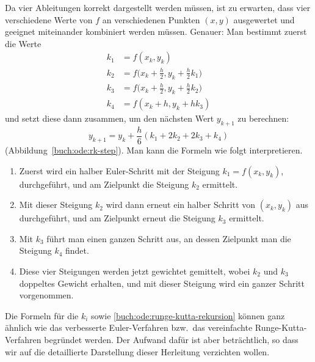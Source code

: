 Da vier Ableitungen korrekt dargestellt werden müssen, ist zu erwarten,
dass vier verschiedene Werte von $f$ an verschiedenen Punkten $(x,y)$
ausgewertet und geeignet miteinander kombiniert werden müssen.
Genauer: Man bestimmt zuerst die Werte
\begin{align*}
k_1&=f(x_k,y_k)\\
k_2&=f\biggl(x_k+\frac{h}2,y_k+\frac{h}2k_1\biggr)\\
k_3&=f\biggl(x_k+\frac{h}2,y_k+\frac{h}2k_2\biggr)\\
k_4&=f(x_k+h, y_k+hk_3)
\end{align*}
und setzt diese dann zusammen, um den nächsten Wert $y_{k+1}$
zu berechnen:
\begin{equation}
y_{k+1} = y_k + \frac{h}6(k_1 + 2k_2 + 2k_3 + k_4)
\label{buch:ode:runge-kutta-rekursion}
\end{equation}
(Abbildung~\ref{buch:ode:rk-step}).
Man kann die Formeln wie folgt interpretieren.
\begin{enumerate}
\item
Zuerst wird ein halber Euler-Schritt mit der Steigung $k_1=f(x_k,y_k)$,
durchgeführt, und am Zielpunkt die Steigung $k_2$ ermittelt.
\item
Mit dieser Steigung $k_2$ wird dann erneut ein halber Schritt von $(x_k,y_k)$
aus durchgeführt, und am Zielpunkt erneut die Steigung $k_3$ ermittelt.
\item
Mit $k_3$ führt man einen ganzen Schritt aus, an dessen Zielpunkt man die
Steigung $k_4$ findet.
\item
Diese vier Steigungen werden jetzt gewichtet gemittelt, wobei
$k_2$ und $k_3$ doppeltes Gewicht erhalten, und mit dieser
Steigung wird ein ganzer Schritt vorgenommen.
\end{enumerate}

Die Formeln für die $k_i$ sowie \eqref{buch:ode:runge-kutta-rekursion}
können ganz ähnlich wie das verbesserte Euler-Verfahren bzw.~das
vereinfachte Runge-Kutta-Verfahren begründet werden.
Der Aufwand dafür ist aber beträchtlich, so dass wir auf die
detaillierte Darstellung dieser Herleitung verzichten wollen.

